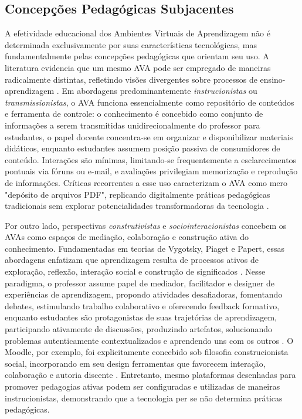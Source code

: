 \documentclass[portuguese]{sbc2025}%
\begin{document}
\subsection{Concepções Pedagógicas Subjacentes}

A efetividade educacional dos Ambientes Virtuais de Aprendizagem não é determinada exclusivamente por suas características tecnológicas, mas fundamentalmente pelas concepções pedagógicas que orientam seu uso. A literatura evidencia que um mesmo AVA pode ser empregado de maneiras radicalmente distintas, refletindo visões divergentes sobre processos de ensino-aprendizagem \cite{Jonassen1999, Bates2015}. Em abordagens predominantemente \textit{instrucionistas} ou \textit{transmissionistas}, o AVA funciona essencialmente como repositório de conteúdos e ferramenta de controle: o conhecimento é concebido como conjunto de informações a serem transmitidas unidirecionalmente do professor para estudantes, o papel docente concentra-se em organizar e disponibilizar materiais didáticos, enquanto estudantes assumem posição passiva de consumidores de conteúdo. Interações são mínimas, limitando-se frequentemente a esclarecimentos pontuais via fóruns ou e-mail, e avaliações privilegiam memorização e reprodução de informações. Críticas recorrentes a esse uso caracterizam o AVA como mero "depósito de arquivos PDF", replicando digitalmente práticas pedagógicas tradicionais sem explorar potencialidades transformadoras da tecnologia \cite{Martins2016}.

Por outro lado, perspectivas \textit{construtivistas} e \textit{sociointeracionistas} concebem os AVAs como espaços de mediação, colaboração e construção ativa do conhecimento. Fundamentadas em teorias de Vygotsky, Piaget e Papert, essas abordagens enfatizam que aprendizagem resulta de processos ativos de exploração, reflexão, interação social e construção de significados \cite{Vygotsky1978, Jonassen1999}. Nesse paradigma, o professor assume papel de mediador, facilitador e designer de experiências de aprendizagem, propondo atividades desafiadoras, fomentando debates, estimulando trabalho colaborativo e oferecendo feedback formativo, enquanto estudantes são protagonistas de suas trajetórias de aprendizagem, participando ativamente de discussões, produzindo artefatos, solucionando problemas autenticamente contextualizados e aprendendo uns com os outros \cite{Harasim2012}. O Moodle, por exemplo, foi explicitamente concebido sob filosofia construcionista social, incorporando em seu design ferramentas que favorecem interação, colaboração e autoria discente \cite{Dougiamas2003, Alves2009}. Entretanto, mesmo plataformas desenhadas para promover pedagogias ativas podem ser configuradas e utilizadas de maneiras instrucionistas, demonstrando que a tecnologia per se não determina práticas pedagógicas.
\end{document}

